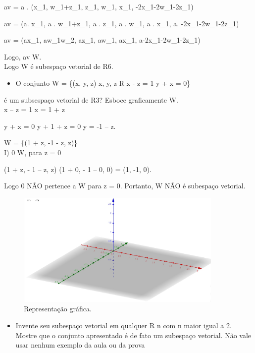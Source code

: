 \documentclass{article}
\begin{document}
av = a . (x_1, w_1+z_1, z_1, w_1, x_1, -2x_1-2w_1-2z_1) 

 av = (a. x_1, a . w_1+z_1, a . z_1, a . w_1, a . x_1, a. -2x_1-2w_1-2z_1)  

av = (ax_1, aw_1w_2, az_1, aw_1, ax_1, a-2x_1-2w_1-2z_1) 

Logo, av \in W. \\

Logo W é subespaço vetorial de R6.\\

\begin{itemize}
\\\item O conjunto W = \{(x, y, z) \mid  x, y, z \in R \land x - z = 1 \land  y + x = 0\} \end{itemize}
    
    \item é um subsespaço vetorial de R3? Esboce graficamente W.\\

x – z = 1 \to x = 1 + z

y + x = 0 \to y + 1 + z = 0 \to y = -1 – z. 

W = \{(1 + z, -1 - z, z)\} \\

I) 0 \in W, para z = 0 

(1 + z, - 1 – z, z) \to (1 + 0, - 1 – 0, 0) = (1, -1, 0).  

Logo 0 NÃO pertence a W para z = 0. Portanto, W NÃO é subespaço vetorial.\\ 

\begin{figure}[!h]
\centering
\includegraphics[width=10cm]{graficoquestao3.jpg}
\caption{Representação gráfica.}
\label{fig:graficoquesto3.jpg}
\end{figure}


\begin{itemize}

\item Invente seu subespaço vetorial em qualquer R n com n maior igual a 2. Mostre que o conjunto apresentado é de fato
um subespaço vetorial. Não vale usar nenhum exemplo da aula ou da prova
\end{itemize}
\end{document}
